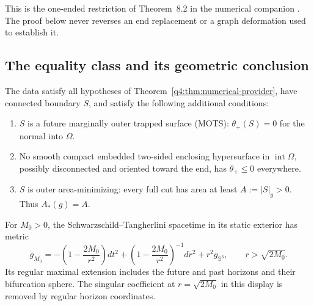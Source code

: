 This is the one-ended restriction of Theorem~8.2 in the numerical
companion \cite{CompanionNumerical}. The proof below never reverses an
end replacement or a graph deformation used to establish it.

\subsection{The equality class and its geometric conclusion}

\begin{definition}\label{q4:def:horizon}
The data satisfy all hypotheses of
Theorem~\ref{q4:thm:numerical-provider}, have connected boundary $S$, and
satisfy the following additional conditions:
\begin{enumerate}[label=(\roman*),leftmargin=*]
\item $S$ is a future marginally outer trapped surface (MOTS):
      $\theta_+(S)=0$ for the normal into $\Omega$.
\item No smooth compact embedded two-sided enclosing hypersurface in
      $\operatorname{int}\Omega$, possibly disconnected and oriented toward
      the end, has $\theta_+\le0$ everywhere.
\item $S$ is outer area-minimizing: every full cut has area at least
      $A:=|S|_g>0$. Thus $A_*(g)=A$.
\end{enumerate}
\end{definition}

For $M_0>0$, the Schwarzschild--Tangherlini spacetime
\cite{Tangherlini1963} in its static exterior has metric
\begin{equation}\label{q4:eq:intro-tangherlini}
 \overline g_{M_0}
 =-\left(1-\frac{2M_0}{r^2}\right)dt^2
  +\left(1-\frac{2M_0}{r^2}\right)^{-1}dr^2
  +r^2g_{\mathbb S^3},\qquad r>\sqrt{2M_0}.
\end{equation}
Its regular maximal extension includes the future and past horizons and
their bifurcation sphere. The singular coefficient at $r=\sqrt{2M_0}$
in this display is removed by regular horizon coordinates.

